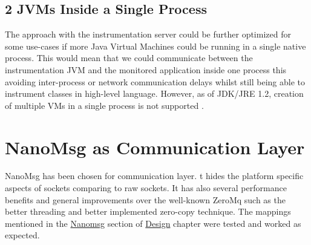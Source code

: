 \subsection{2 JVMs Inside a Single Process}
The approach with the instrumentation server could be further optimized for some use-cases if more Java Virtual Machines could be running in a single native process. This would mean that we could communicate between the instrumentation JVM and the monitored application inside one process this avoiding inter-process or network communication delays whilst still being able to instrument classes in high-level language. However, as of JDK/JRE 1.2, creation of multiple VMs in a single process is not supported \cite{MoreJVMOnceProccess}.

\section{NanoMsg as Communication Layer}
NanoMsg has been chosen for communication layer. t hides the platform specific aspects of sockets comparing to raw sockets. It has also several performance benefits and general improvements over the well-known ZeroMq such as the better threading and better implemented zero-copy technique. The mappings mentioned in the \hyperref[sec:nanomsg]{Nanomsg} section of \hyperref[chap:background]{Design} chapter were tested and worked as expected.





